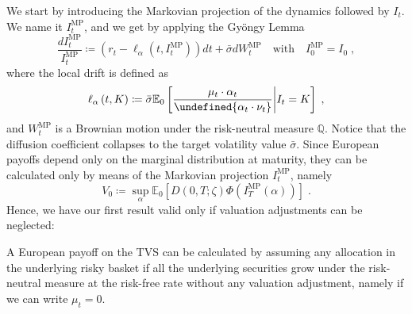\documentclass[runningheads]{m2ef}
\let\norm\undefined %
\DeclarePairedDelimiter\norm{\lVert}{\rVert}
\begin{document}
We start by introducing the Markovian projection of the dynamics followed by $I_t$. We name it $I_t^{\text{MP}}$, and we get by applying the Gy\"ongy Lemma \cite{Gyongy1986}
\begin{equation}
    \frac{dI_t^{\text{MP}}}{I_t^{\text{MP}}} \coloneqq \left(r_t - \ell_{\alpha} \left(t,I_t^{\text{MP}}\right)\right)dt + \bar{\sigma}dW_t^{\text{MP}} \quad \text{with} \quad I_0^\text{MP} = I_0 \; ,
\label{eq:markovian_projection}\end{equation}
where the local drift is defined as
\begin{equation}
    \ell_\alpha \left(t,K\right) \coloneqq \bar{\sigma} \mathbb{E}_0\left[\frac{\mu_t \cdot \alpha_t}{\norm{\alpha_t \cdot \nu_t }}\bigg|I_t = K\right] \; ,
\label{eq:local_drift}\end{equation}
and $W_t^{\text{MP}}$ is a Brownian motion under the risk-neutral measure $\mathbb{Q}$. Notice that the diffusion coefficient collapses to the target volatility value $\bar{\sigma}$. Since European payoffs depend only on the marginal distribution at maturity, they can be calculated only by means of the Markovian projection $I_t^{\text{MP}}$, namely
\begin{equation}
V_0 \coloneqq \sup_{\alpha} \mathbb{E}_0\left[D\left(0,T;\zeta\right)\Phi\left(I_T^{\text{MP}}\left(\alpha\right)\right)\right] \; .
\end{equation}
Hence, we have our first result valid only if valuation adjustments can be neglected:
\begin{proposition}
A European payoff on the TVS can be calculated by assuming any allocation in the underlying risky basket if all the underlying
securities grow under the risk-neutral measure at the risk-free rate without any valuation adjustment, namely if we can write $\mu_t=0$.
\end{proposition}
\end{document}
